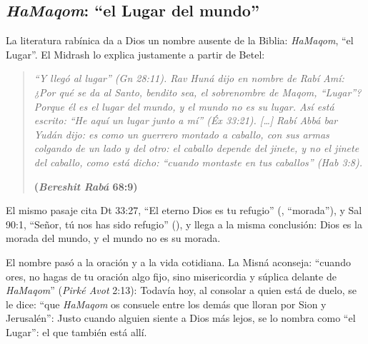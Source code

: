 \subsection{\emph{HaMaqom}: “el Lugar del mundo”}

La literatura rabínica da a Dios un nombre ausente de la Biblia:  \emph{HaMaqom}, ``el Lugar''. El Midrash lo explica justamente a partir de Betel:

\begin{quote}\itshape
``Y llegó al lugar'' (Gn 28:11). Rav Huná dijo en nombre de Rabí Amí: ¿Por qué se da al Santo, bendito sea, el sobrenombre de \emph{Maqom}, ``Lugar''? Porque él es el lugar del mundo, y el mundo no es su lugar. Así está escrito: ``He aquí un lugar junto a mí'' (Éx 33:21). [\ldots] Rabí Abbá bar Yudán dijo: es como un guerrero montado a caballo, con sus armas colgando de un lado y del otro: el caballo depende del jinete, y no el jinete del caballo, como está dicho: ``cuando montaste en tus caballos'' (Hab 3:8).\par\hfill{\upshape\small\bfseries\textcolor{azul}{(\emph{Bereshit Rabá} 68:9)}}
\end{quote}

El mismo pasaje cita Dt 33:27, ``El eterno Dios es tu refugio'' (, ``morada''), y Sal 90:1, ``Señor, tú nos has sido refugio'' (), y llega a la misma conclusión: Dios es la morada del mundo, y el mundo no es su morada.


El nombre pasó a la oración y a la vida cotidiana. La Misná aconseja: ``cuando ores, no hagas de tu oración algo fijo, sino misericordia y súplica delante de \emph{HaMaqom}'' (\emph{Pirké Avot} 2:13):
Todavía hoy, al consolar a quien está de duelo, se le dice: ``que \emph{HaMaqom} os consuele entre los demás que lloran por Sion y Jerusalén'':
\noindent Justo cuando alguien siente a Dios más lejos, se lo nombra como ``el Lugar'': el que también está allí.


